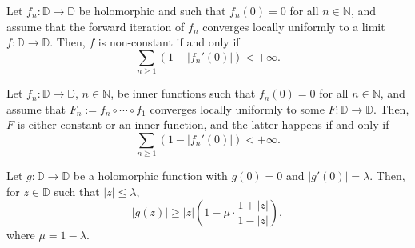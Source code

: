 \documentclass[10pt,a4paper]{amsart}
\def\D{\mathbb{D}}
\begin{document}
\begin{thmout} \label{thmout:class}
Let $f_n:\D\to\D$ be holomorphic and such that $f_n(0) = 0$ for all $n\in\mathbb{N}$, and assume that the forward iteration of $f_n$ converges locally uniformly to a limit $f:\D\to\D$. Then, $f$ is non-constant if and only if
\begin{equation*}
    \sum_{n\geq 1} (1 - |f_n'(0)|) < +\infty.
\end{equation*}
\end{thmout}

\begin{theorem} \label{thm:inner}
Let $f_n:\D\to\D$, $n\in\mathbb{N}$, be inner functions such that $f_n(0) = 0$ for all $n\in\mathbb{N}$, and assume that $F_n := f_n\circ\cdots\circ f_1$ converges locally uniformly to some $F:\D\to\D$. Then, $F$ is either constant or an inner function, and the latter happens if and only if
\[ \sum_{n\geq 1} (1 - |f_n'(0)|) < +\infty. \]
\end{theorem}

\begin{lemma} \label{lem:estimates}
Let $g:\D\to\D$ be a holomorphic function with $g(0) = 0$ and $|g'(0)| = \lambda$. Then, for $z\in\D$ such that $|z| \leq \lambda$,
\[ |g(z)| \geq |z|\left(1 - \mu\cdot\frac{1 + |z|}{1 - |z|}\right), \]
where $\mu = 1 - \lambda$.
\end{lemma}
\end{document}
